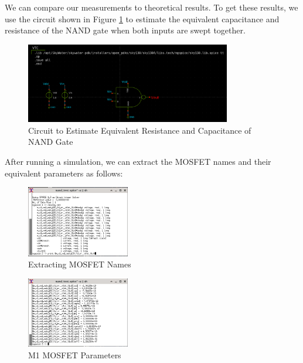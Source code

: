 \documentclass{article}
\begin{document}
	We can compare our measurements to theoretical results. To get these results, we use the circuit shown in Figure \ref{fig::nand_eq_test_sweep_va_vb} to estimate the equivalent capacitance and resistance of the NAND gate when both inputs are swept together.
	
	\begin{figure}[H]
		\centerline{\includegraphics[width=0.8\textwidth]{nand_eq_test_sweep_va_vb.png}}
		\caption{Circuit to Estimate Equivalent Resistance and Capacitance of NAND Gate}
		\label{fig::nand_eq_test_sweep_va_vb}
	\end{figure}
	
	\noindent After running a simulation, we can extract the MOSFET names and their equivalent parameters as follows:
	
	\begin{figure}[H]
		\centerline{\includegraphics[width=0.4\textwidth]{nand_eq_display_sweep_va_vb.png}}
		\caption{Extracting MOSFET Names}
		\label{fig::nand_eq_display_sweep_va_vb}
	\end{figure}
	
	\begin{figure}[H]
		\centerline{\includegraphics[width=0.4\textwidth]{nand_eq_params_sweep_va_vb.png}}
		\caption{M1 MOSFET Parameters}			\label{fig::nand_eq_params_sweep_va_vb}
	\end{figure}
	
\end{document}
